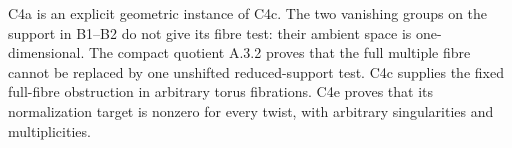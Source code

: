 C4a is an explicit geometric instance of C4c. The two vanishing groups on the support in B1--B2 do not give its fibre test: their ambient space is one-dimensional. The compact quotient A.3.2 proves that the full multiple fibre cannot be replaced by one unshifted reduced-support test. C4c supplies the fixed full-fibre obstruction in arbitrary torus fibrations. C4e proves that its normalization target is nonzero for every twist, with arbitrary singularities and multiplicities.



